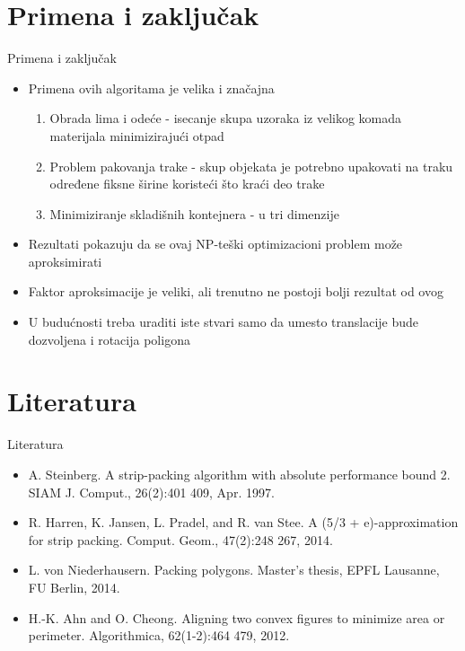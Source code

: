 \documentclass{beamer}
\theoremstyle{plain}
\begin{document}
\section{Primena i zaključak}
\begin{frame}{Primena i zaključak}
\begin{itemize}
    \item Primena ovih algoritama je velika i značajna
    \begin{enumerate}
        \item Obrada lima i odeće - isecanje skupa uzoraka iz velikog komada materijala minimizirajući otpad
        \item Problem pakovanja trake - skup objekata je potrebno upakovati na traku određene fiksne širine koristeći što kraći deo trake
        \item Minimiziranje skladišnih kontejnera - u tri dimenzije
    \end{enumerate}
    \item Rezultati pokazuju da se ovaj NP-teški optimizacioni problem može aproksimirati
    \item Faktor aproksimacije je veliki, ali trenutno ne postoji bolji rezultat od ovog
    \item U budućnosti treba uraditi iste stvari samo da umesto translacije bude dozvoljena i rotacija poligona
\end{itemize}
\end{frame}

\section{Literatura}
\begin{frame}{Literatura}
\begin{itemize}
    \item A. Steinberg. A strip-packing algorithm with absolute performance bound 2. SIAM J. Comput., 26(2):401 409, Apr. 1997.
    \item R. Harren, K. Jansen, L. Pradel, and R. van Stee. A (5/3 + e)-approximation for strip packing. Comput. Geom., 47(2):248 267, 2014.
    \item L. von Niederhausern. Packing polygons. Master's thesis, EPFL Lausanne, FU Berlin, 2014.
    \item H.-K. Ahn and O. Cheong. Aligning two convex figures to minimize area or perimeter. Algorithmica, 62(1-2):464 479, 2012.
\end{itemize}
\end{frame}
\end{document}
